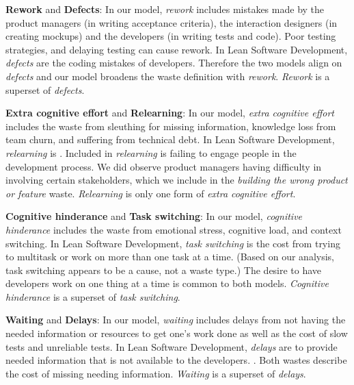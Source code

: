 

\textbf{Rework} and \textbf{Defects}: In our model, \textit{rework} includes mistakes made by the product managers (in writing acceptance criteria), the interaction designers (in creating mockups) and the developers (in writing tests and code). Poor testing strategies, and delaying testing can cause rework. In Lean Software Development, \textit{defects} are the coding mistakes of developers. Therefore the two models align on \textit{defects} and our model broadens the waste definition with \textit{rework}. \textit{Rework} is a superset of \textit{defects}. 


\textbf{Extra cognitive effort} and \textbf{Relearning}: In our model, \textit{extra cognitive effort} includes the waste from sleuthing for missing information, knowledge loss from team churn, and suffering from technical debt. In Lean Software Development, \textit{relearning} is  \cite{PoppendieckConceptToCash}. Included in \textit{relearning} is failing to engage people in the development process. We did observe product managers having difficulty in involving certain stakeholders, which we include in the \textit{building the wrong product or feature} waste. \textit{Relearning} is only one form of \textit{extra cognitive effort}.


\textbf{Cognitive hinderance} and \textbf{Task switching}: In our model, \textit{cognitive hinderance} includes the waste from emotional stress, cognitive load, and context switching. In Lean Software Development, \textit{task switching} is the cost from trying to multitask or work on more than one task at a time. (Based on our analysis, task switching appears to be a cause, not a waste type.) The desire to have developers work on one thing at a time is common to both models. \textit{Cognitive hinderance} is a superset of \textit{task switching}.  


\textbf{Waiting} and \textbf{Delays}: In our model, \textit{waiting} includes delays from not having the needed information or resources to get one's work done as well as the cost of slow tests and unreliable tests. In Lean Software Development, \textit{delays} are  to provide needed information that is not available to the developers. \cite{PoppendieckConceptToCash}. Both wastes describe the cost of missing needing information. \textit{Waiting} is a superset of \textit{delays}.
